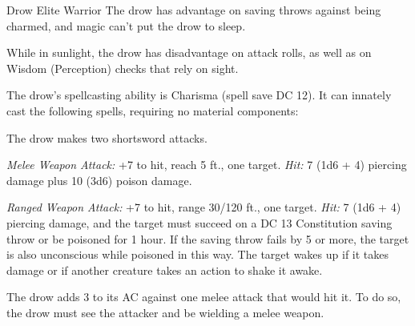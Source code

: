 \documentclass[10pt,a4paper,twoside,fancy,bg=print,twocolumn,openany,nodeprecatedcode]{dndbook}
\begin{document}
\begin{DndMonster}[float=t]{Drow Elite Warrior}
\DndMonsterBasics[
armor-class = {18 (studded leather armor)},
hit-points = {\DndDice{11d8 + 22}},
speed = {30 ft.}
]
\DndMonsterAbilityScores[
 str = 13,
 dex = 18,
 con = 14,
 int = 11,
 wis = 13,
 cha = 12
]
\DndMonsterDetails[
saving-throws = {Dex +7, Con +5, Wis +4},
skills = {Perception +4, Stealth +10},
senses = {darkvision 120 ft., passive perception 14},
languages = {Elvish, Undercommon},
challenge = 5,
]
The drow has advantage on saving throws against being charmed, and magic can't put the drow to sleep.

While in sunlight, the drow has disadvantage on attack rolls, as well as on Wisdom (Perception) checks that rely on sight.

The drow's spellcasting ability is Charisma (spell save DC 12). It can innately cast the following spells, requiring no material components:
\begin{DndMonsterSpells}
\end{DndMonsterSpells}
The drow makes two shortsword attacks.

\textsl{Melee Weapon Attack:} +7 to hit, reach 5 ft., one target. \textsl{Hit:} 7 (1d6 + 4) piercing damage plus 10 (3d6) poison damage.

\textsl{Ranged Weapon Attack:} +7 to hit, range 30/120 ft., one target. \textsl{Hit:} 7 (1d6 + 4) piercing damage, and the target must succeed on a DC 13 Constitution saving throw or be poisoned for 1 hour. If the saving throw fails by 5 or more, the target is also unconscious while poisoned in this way. The target wakes up if it takes damage or if another creature takes an action to shake it awake.

The drow adds 3 to its AC against one melee attack that would hit it. To do so, the drow must see the attacker and be wielding a melee weapon.

\end{DndMonster}
\end{document}

